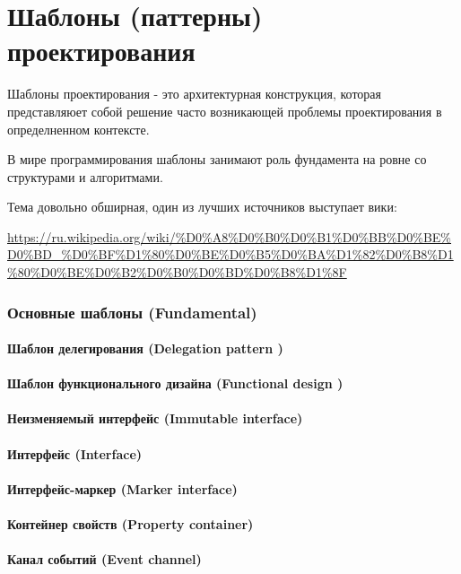 \part{Шаблоны (паттерны) проектирования}

Шаблоны проектирования - это архитектурная конструкция, которая представляюет собой решение часто возникающей проблемы проектирования в определненном контексте.

В мире программирования шаблоны занимают роль фундамента на ровне со структурами и алгоритмами.

Тема довольно обширная, один из лучших источников выступает вики:

\url{https://ru.wikipedia.org/wiki/%D0%A8%D0%B0%D0%B1%D0%BB%D0%BE%D0%BD_%D0%BF%D1%80%D0%BE%D0%B5%D0%BA%D1%82%D0%B8%D1%80%D0%BE%D0%B2%D0%B0%D0%BD%D0%B8%D1%8F}

\section{Основные шаблоны (Fundamental)}

\subsection{Шаблон делегирования (Delegation pattern )}
\subsection{Шаблон функционального дизайна (Functional design )}
\subsection{Неизменяемый интерфейс (Immutable interface)}
\subsection{Интерфейс (Interface)}
\subsection{Интерфейс-маркер (Marker interface)}
\subsection{Контейнер свойств (Property container)}
\subsection{Канал событий (Event channel)}

